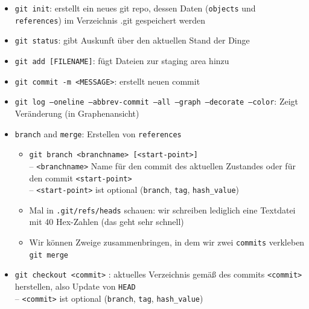\begin{itemize}
	\item \texttt{git init}: erstellt ein neues git repo, dessen Daten (\texttt{objects} und \texttt{references}) im Verzeichnis .git gespeichert werden
\item	\texttt{git status}: gibt Auskunft über den aktuellen Stand der Dinge
\item	\texttt{git add [FILENAME]}: fügt Dateien zur staging area hinzu
\item	\texttt{git commit -m <MESSAGE>}: erstellt neuen commit
\item \texttt{git log --oneline --abbrev-commit --all --graph --decorate --color}: Zeigt Veränderung (in Graphenansicht)
\item \texttt{branch} and \texttt{merge}: Erstellen von \texttt{references}
\begin{itemize}
	\item \texttt{git branch <branchname> [<start-point>]}\\
	-- \texttt{<branchname>} Name für den commit des aktuellen Zustandes oder für den commit \texttt{<start-point>}\\
	-- \texttt{<start-point>} ist optional (\texttt{branch}, \texttt{tag}, \texttt{hash\_value})
	\item Mal in \texttt{.git/refs/heads} schauen: wir schreiben lediglich eine Textdatei mit 40 Hex-Zahlen (das geht sehr schnell)
	\item Wir können Zweige zusammenbringen, in dem wir zwei \texttt{commits} verkleben\\
	\texttt{git merge}
\end{itemize}
\item \texttt{git checkout <commit>} : aktuelles Verzeichnis gemäß des commits \texttt{<commit>} herstellen, also Update von \texttt{HEAD}\\
-- \texttt{<commit>} ist optional (\texttt{branch}, \texttt{tag}, \texttt{hash\_value})
\end{itemize}








